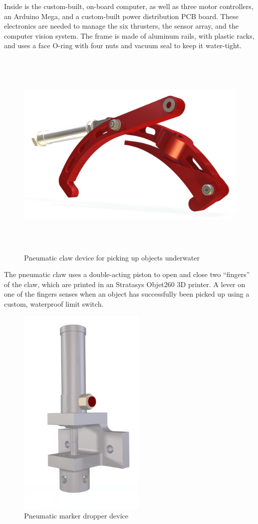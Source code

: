 \documentclass[12pt, landscape]{article}
\begin{document}
	Inside is the custom-built, on-board computer, as well as three motor controllers, an Arduino Mega, and a custom-built power distribution PCB board.  These electronics are needed to manage the six thrusters, the sensor array, and the computer vision system.  The frame is made of aluminum rails, with plastic racks, and uses a face O-ring with four nuts and vacuum seal to keep it water-tight. 

	\begin{figure}[H]
		\centering
		\includegraphics[height=4in]{media/GRABBER-RENDER-ALPHA.png}
		\caption{Pneumatic claw device for picking up objects underwater}
		\label{grabber}
	\end{figure}

	The pneumatic claw uses a double-acting piston to open and close two ``fingers'' of the claw, which are printed in an Stratasys Objet260 3D printer.  A lever on one of the fingers senses when an object has successfully been picked up using a custom, waterproof limit switch.  

	\begin{figure}[H]
		\centering
		\includegraphics[height=4in]{media/marker_dropper.png}
		\caption{Pneumatic marker dropper device}
		\label{marker}
	\end{figure}
\end{document}
